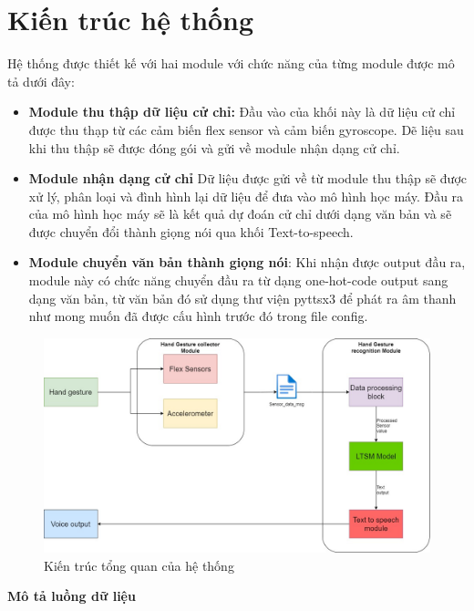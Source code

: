 \section{Kiến trúc hệ thống}
Hệ thống được thiết kế với hai module với chức năng của từng module được mô tả dưới đây:
\begin{itemize}
    \item \textbf{Module thu thập dữ liệu cử chỉ:} Đầu vào của khối này là dữ liệu cử chỉ được thu thạp từ các cảm biến flex sensor và cảm biến gyroscope. Dẽ liệu sau khi thu thập sẽ được đóng gói và gửi về module nhận dạng cử chỉ.
    \item \textbf{Module nhận dạng cử chỉ} Dữ liệu được gửi về từ module thu thập sẽ được xử lý, phân loại và đình hình lại dữ liệu để đưa vào mô hình học máy. Đầu ra của mô hình học máy sẽ là kết quả dự đoán cử chỉ dưới dạng văn bản và sẽ được chuyển đổi thành giọng nói qua khối Text-to-speech.
    \item \textbf{Module chuyển văn bản thành giọng nói}: Khi nhận được output đầu ra, module này có chức năng chuyển đầu ra từ dạng one-hot-code output sang dạng văn bản, từ văn bản đó sử dụng thư viện pyttsx3 để phát ra âm thanh như mong muốn đã được cấu hình trước đó trong file config.
\end{itemize}
\begin{figure}[H]
    \centering
    \includegraphics[width=\textwidth,height=\textheight,keepaspectratio]{Images/Theoretical basis/FlexArchitecture.jpg}
    \caption{Kiến trúc tổng quan của hệ thống}
    \label{fig:enter-label}
\end{figure}
\textbf{Mô tả luồng dữ liệu}
